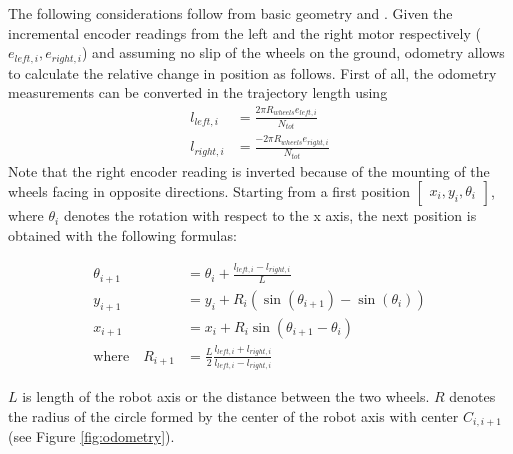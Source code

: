 The following considerations follow from basic geometry and \cite{Borenstein1996}.
Given the incremental encoder readings from the left and the right motor respectively ($e_{left,i},e_{right,i}$) and assuming no slip of the wheels on the ground, odometry allows to calculate the relative change in position as follows.
First of all, the odometry measurements can be converted in the trajectory length using
\begin{align}
    l_{left,i} &= \frac{2\pi R_{wheels} e_{left,i}}{N_{tot}} \\
    l_{right,i} &= \frac{-2\pi R_{wheels} e_{right,i}}{N_{tot}}
    \label{eq:encoders} 
\end{align}
Note that the right encoder reading is inverted because of the mounting of the wheels facing in opposite directions.
Starting from a first position $\begin{bmatrix} x_i,y_i,\theta_i \end{bmatrix}$, where $\theta_i$ denotes the rotation with respect to the x axis, the next position is obtained with the following formulas:

\begin{subequations}
    \begin{align}
        \theta_{i+1} &= \theta_i + \frac{l_{left,i}-l_{right,i}}{L} \\
        y_{i+1} &= y_i + R_i (\sin(\theta_{i+1})-\sin(\theta_{i})) \\
        x_{i+1} &= x_i + R_i \sin(\theta_{i+1}-\theta_i) \\
        \text{where} \quad R_{i+1} &= \frac{L}{2} \frac{l_{left,i}+l_{right,i}}{l_{left,i}-l_{right,i}} 
    \label{eq:positions}
\end{align}
\end{subequations}

$L$ is length of the robot axis or the distance between the two wheels. 
$R$ denotes the radius of the circle formed by the center of the robot axis with center $C_{i,i+1}$ (see Figure \ref{fig:odometry}).


